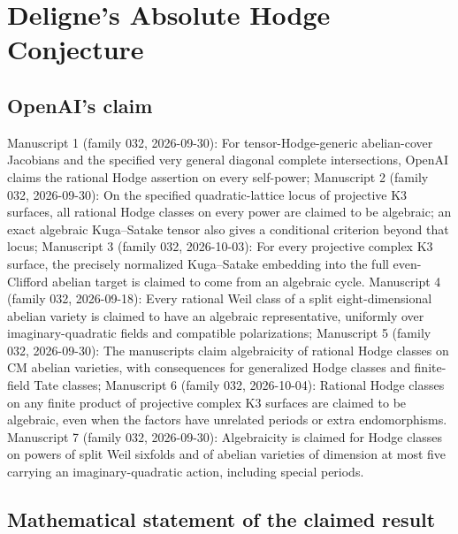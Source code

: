 \documentclass[11pt]{article}
\begin{document}
\section*{Deligne's Absolute Hodge Conjecture}

\subsection{OpenAI's claim}
Manuscript 1 (family 032, 2026-09-30): For tensor-Hodge-generic abelian-cover Jacobians and the specified very general diagonal complete intersections, OpenAI claims the rational Hodge assertion on every self-power; Manuscript 2 (family 032, 2026-09-30): On the specified quadratic-lattice locus of projective K3 surfaces, all rational Hodge classes on every power are claimed to be algebraic; an exact algebraic Kuga--Satake tensor also gives a conditional criterion beyond that locus; Manuscript 3 (family 032, 2026-10-03): For every projective complex K3 surface, the precisely normalized Kuga--Satake embedding into the full even-Clifford abelian target is claimed to come from an algebraic cycle. Manuscript 4 (family 032, 2026-09-18): Every rational Weil class of a split eight-dimensional abelian variety is claimed to have an algebraic representative, uniformly over imaginary-quadratic fields and compatible polarizations; Manuscript 5 (family 032, 2026-09-30): The manuscripts claim algebraicity of rational Hodge classes on CM abelian varieties, with consequences for generalized Hodge classes and finite-field Tate classes; Manuscript 6 (family 032, 2026-10-04): Rational Hodge classes on any finite product of projective complex K3 surfaces are claimed to be algebraic, even when the factors have unrelated periods or extra endomorphisms. Manuscript 7 (family 032, 2026-09-30): Algebraicity is claimed for Hodge classes on powers of split Weil sixfolds and of abelian varieties of dimension at most five carrying an imaginary-quadratic action, including special periods.

\subsection{Mathematical statement of the claimed result}
\end{document}
